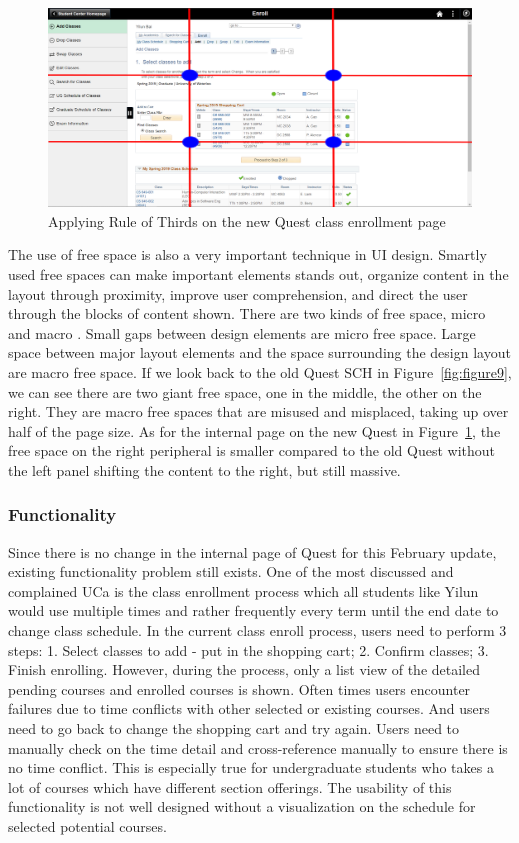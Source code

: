 \documentclass[conference]{IEEEtran}
\begin{document}
\begin{figure}[htdp]
\centering
  \includegraphics[width=1\columnwidth]{grid_enroll_page.png}
  \caption{Applying Rule of Thirds on the new Quest class enrollment page}
  \label{fig:figure11}
\end{figure}


The use of free space is also a very important technique in UI design. Smartly used free spaces can make important elements stands out, organize content in the layout through proximity, improve user comprehension, and direct the user through the blocks of content shown. There are two kinds of free space, micro and macro \cite{b12}. Small gaps between design elements are micro free space. Large space between major layout elements and the space surrounding the design layout are macro free space. If we look back to the old Quest SCH in Figure~\ref{fig:figure9}, we can see there are two giant free space, one in the middle, the other on the right. They are macro free spaces that are misused and misplaced, taking up over half of the page size. As for the internal page on the new Quest in Figure~\ref{fig:figure11}, the free space on the right peripheral is smaller compared to the old Quest without the left panel shifting the content to the right, but still massive. 

\subsubsection{Functionality}
Since there is no change in the internal page of Quest for this February update, existing functionality problem still exists. One of the most discussed and complained UCa is the class enrollment process which all students like Yilun would use multiple times and rather frequently every term until the end date to change class schedule. In the current class enroll process, users need to perform 3 steps: 1. Select classes to add - put in the shopping cart; 2. Confirm classes; 3. Finish enrolling. However, during the process, only a list view of the detailed pending courses and enrolled courses is shown. Often times users encounter failures due to time conflicts with other selected or existing courses. And users need to go back to change the shopping cart and try again. Users need to manually check on the time detail and cross-reference manually to ensure there is no time conflict. This is especially true for undergraduate students who takes a lot of courses which have different section offerings. The usability of this functionality is not well designed without a visualization on the schedule for selected potential courses.
\end{document}
